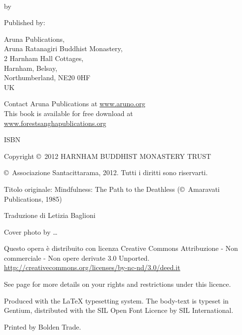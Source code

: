 {\small\setlength{\parskip}{0.8em}\setlength{\parindent}{0em}%
{\raggedright%

\thetitle\\
by \theauthor

Published by:

Aruna Publications,\\
Aruna Ratanagiri Buddhist Monastery,\\
2 Harnham Hall Cottages,\\
Harnham, Belsay,\\
Northumberland, NE20 0HF\\
UK

Contact Aruna Publications at \href{http://aruno.org}{www.aruno.org}\\
This book is available for free download at\\
\href{http://forestsanghapublications.org/}{www.forestsanghapublications.org}

ISBN \theISBN

Copyright \copyright\ 2012 HARNHAM BUDDHIST MONASTERY TRUST

\copyright\ Associazione Santacittarama, 2012. Tutti i diritti sono riservarti.

Titolo originale: Mindfulness: The Path to the Deathless (\copyright\ Amaravati Publications, 1985)

Traduzione di Letizia Baglioni

Cover photo by \ldots

\vfill

{\tiny

Questo opera è distribuito con licenza Creative Commons Attribuzione - Non commerciale - Non opere derivate 3.0 Unported.\\
\href{http://creativecommons.org/licenses/by-nc-nd/3.0/deed.it}{http://creativecommons.org/licenses/by-nc-nd/3.0/deed.it}

See page \pageref{copyright-details} for more details on your rights and restrictions under this licence.

Produced with the {\selectfont\LaTeX} typesetting system. The body-text is typeset in Gentium, distributed with the SIL Open Font Licence by SIL International.

\theEditionInfo

Printed by Bolden Trade.

}

}}

